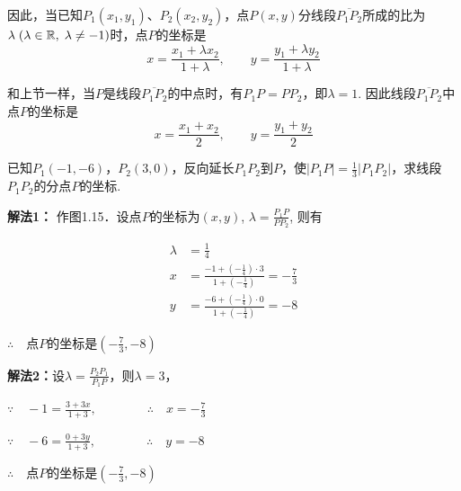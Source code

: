因此，当已知$P_1(x_1,y_1)$、$P_2(x_2,y_2)$，点$P(x,y)$分线段$\overline{P_1P_2}$所成的比为$\lambda\; (\lambda\in\mathbb{R},\; \lambda\ne -1)$时，点$P$的坐标是
\[x=\frac{x_1+\lambda x_2}{1+\lambda},\qquad y=\frac{y_1+\lambda y_2}{1+\lambda}\]

和上节一样，当$P$是线段$\overline{P_1P_2}$的中点时，有$P_1P=PP_2$，即$\lambda=1$. 因此线段$\overline{P_1P_2}$中点$P$的坐标是
\[x=\frac{x_1+x_2}{2},\qquad y=\frac{y_1+y_2}{2}\]

\begin{example}
已知$P_1(-1,-6)$，$P_2(3,0)$，反向延长$P_1P_2$到$P$，使$|P_1P|=\frac{1}{3}|P_1P_2|$，求线段$P_1P_2$的分点$P$的坐标.
\end{example}

\begin{solution}
    \textbf{解法1：} 作图1.15．设点$P$的坐标为$(x,y)$, $\lambda=\frac{P_1P}{PP_2}$, 则有

\noindent
\begin{minipage}{.55\textwidth}
\[\begin{split}
\lambda&=\frac{1}{4}\\
x&=\frac{-1+\left(-\frac{1}{4}\right)\cdot 3}{1+\left(-\frac{1}{4}\right)}=-\frac{7}{3}\\
y&=\frac{-6+\left(-\frac{1}{4}\right)\cdot 0}{1+\left(-\frac{1}{4}\right)}=-8
\end{split}\]

$\therefore\quad $点$P$的坐标是$\left(-\frac{7}{3},-8\right)$
\end{minipage}\hfill
\begin{minipage}{.45\textwidth}
\centering
{}
\end{minipage}

\textbf{解法2：}设$\lambda=\frac{P_2P_1}{P_1P}$，则$\lambda=3$，

$\because\quad -1=\frac{3+3x}{1+3},\qquad \qquad \therefore\quad x=-\frac{7}{3}$

$\because\quad -6=\frac{0+3y}{1+3},\qquad \qquad \therefore\quad y=-8$

$\therefore\quad $点$P$的坐标是$\left(-\frac{7}{3},-8\right)$
\end{solution}

